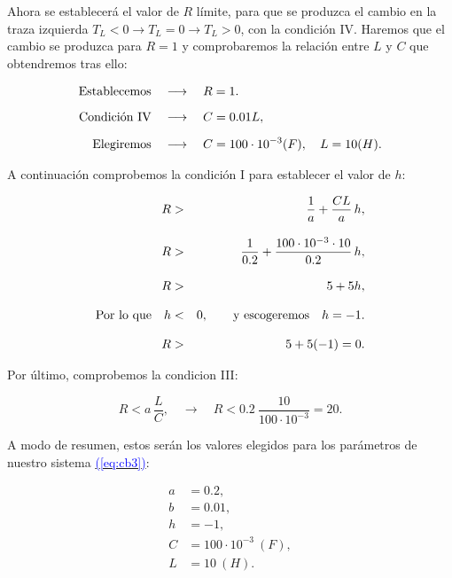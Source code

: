 \documentclass[12pt,a4paper]{report} %
\newcommand{\eref}[1]{\hyperref[#1]{\textcolor{blue}{(\ref*{#1})}}}
\newcommand{\eref}[1]{\hyperref[#1]{\textcolor{blue}{\textit{(\ref*{#1})}}}}
\begin{document}
	\vspace{0.5cm}\noindent Ahora se establecerá el valor de $R$ límite, para que se produzca el cambio en la traza izquierda $T_L<0 \rightarrow T_L=0 \rightarrow T_L>0$, con la condición IV. Haremos que el cambio se produzca para $R=1$ y comprobaremos la relación entre $L$ y $C$ que obtendremos tras ello:
	
	\begin{subequations}
		\label{eq:condd}
		\begin{align}
			\text{Establecemos} \quad &\longrightarrow \quad R=1. \label{eq:condr}\\[2mm]
			\text{Condición IV} \quad &\longrightarrow \quad C=0.01L,\notag\\[2mm]
			\text{Elegiremos} \quad &\longrightarrow \quad C=100\cdot10^{-3}(F), \quad L=10(H). \label{eq:condlc}
		\end{align}
	\end{subequations}\smallskip
	
	\vspace{0.5cm}\noindent A continuación comprobemos la condición I para establecer el valor de $h$:

	\begin{eqnarray}
		R&>&\frac{1}{a}+\frac{CL}{a}\, h,\notag\\[3mm]
		R&>&\frac{1}{0.2}+\frac{100\cdot10^{-3}\cdot10}{0.2}\, h, \notag\\[3mm]
		R&>&5+5h, \notag\\[3mm]
		\text{Por lo que}\quad h&<&0, \qquad \text{y escogeremos}\quad h=-1.\label{eq:condh}\\[3mm]
		R&>&5+5(-1)=0. \notag
	\end{eqnarray}\smallskip

	\vspace{0.5cm}\noindent Por último, comprobemos la condicion III:
	
	\begin{equation}
		\label{eq:condr20}
		R<a \, \frac{L}{C}, \quad \longrightarrow \quad R<0.2\:\frac{10}{100\cdot10^{-3}}=20.
	\end{equation}
	
	\newpage
	
	A modo de resumen, estos serán los valores elegidos para los parámetros de nuestro sistema \eref{eq:cb3}:
	
	\begin{equation}
		\label{eq:condiciones}
		\begin{aligned}
			a&=0.2, \\[2mm]
			b&=0.01, \\[2mm]
			h&=-1, \\[2mm]
			C&=100\cdot10^{-3}\:(F), \\[2mm]
			L&=10\:(H).
		\end{aligned}
	\end{equation}
	
\end{document}
